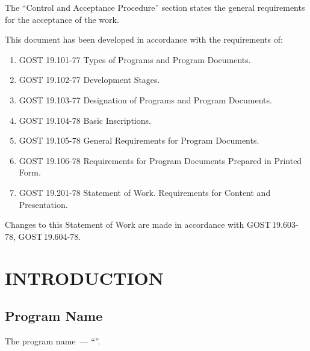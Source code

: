 \documentclass[12pt,a4paper]{extarticle}
\begin{document}
The \enquote{Control and Acceptance Procedure} section states the general requirements for the acceptance of the work.

\clearpage

\noindent
This document has been developed in accordance with the requirements of:

\begin{enumerate}[label=\arabic*), leftmargin=1.25cm]
\item GOST 19.101-77 Types of Programs and Program Documents\cite{gost19101}.
\item GOST 19.102-77 Development Stages\cite{gost19102}.
\item GOST 19.103-77 Designation of Programs and Program Documents\cite{gost19103}.
\item GOST 19.104-78 Basic Inscriptions\cite{gost19104}.
\item GOST 19.105-78 General Requirements for Program Documents\cite{gost19105}.
\item GOST 19.106-78 Requirements for Program Documents Prepared in Printed Form\cite{gost19106}.
\item GOST 19.201-78 Statement of Work. Requirements for Content and Presentation\cite{gost19201}.
\end{enumerate}

Changes to this Statement of Work are made in accordance with GOST\,19.603-78\cite{gost19603}, GOST\,19.604-78\cite{gost19604}.

\clearpage

\hypersetup{linkcolor=black}
\tableofcontents
\hypersetup{linkcolor=blue}
\thispagestyle{fancy}
\clearpage

\section{INTRODUCTION}

\subsection{Program Name}

The program name~--- \enquote{\projectname}.
\end{document}
